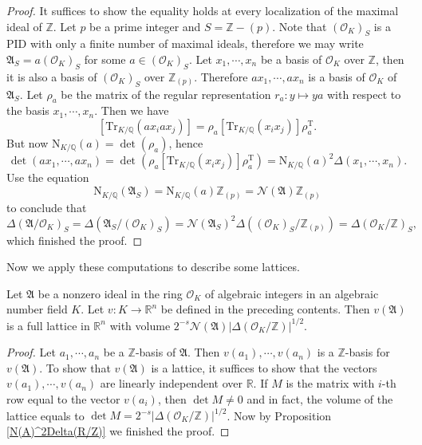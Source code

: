 \begin{proof}
It suffices to show the equality holds at every localization of the maximal ideal of $\mathbb{Z}$. Let $p$ be a prime integer and $S=\mathbb{Z}-(p)$. Note that $(\mathcal{O}_K)_S$ is a PID with only a finite number of maximal ideals, therefore we may write $\mathfrak{A}_S=a(\mathcal{O}_K)_S$ for some $a\in(\mathcal{O}_K)_S$. Let $x_1,\cdots,x_n$ be a basis of $\mathcal{O}_K$ over $\mathbb{Z}$, then it is also a basis of $(\mathcal{O}_K)_S$ over $\mathbb{Z}_{(p)}$. Therefore $ax_1,\cdots,ax_n$ is a basis of $\mathcal{O}_K$ of $\mathfrak{A}_S$. Let $\rho_a$ be the matrix of the regular representation $r_a:y\mapsto ya$ with respect to the basis $x_1,\cdots,x_n$. Then we have 
$$
\left[ \mathrm{Tr}_{K/\mathbb{Q}}\left( ax_iax_j \right) \right] =\rho _a\left[ \mathrm{Tr}_{K/\mathbb{Q}}\left( x_ix_j \right) \right] \rho _{a}^{\mathrm{T}}.
$$
But now $\mathrm{N}_{K/\mathbb{Q}}(a)=\det(\rho_a)$, hence 
$$
\det \left( ax_1,\cdots ,ax_n \right) =\det \left( \rho _a\left[ \mathrm{Tr}_{K/\mathbb{Q}}\left( x_ix_j \right) \right] \rho _{a}^{\mathrm{T}} \right) =\mathrm{N}_{K/\mathbb{Q}}\left( a \right) ^2\Delta \left( x_1,\cdots ,x_n \right) .
$$
Use the equation 
$$
\mathrm{N}_{K/\mathbb{Q}}\left( \mathfrak{A} _S \right) =\mathrm{N}_{K/\mathbb{Q}}\left( a \right) \mathbb{Z} _{\left( p \right)}=\mathcal{N} \left( \mathfrak{A} \right) \mathbb{Z} _{\left( p \right)}
$$
to conclude that 
$$
\Delta \left( \mathfrak{A} /\mathcal{O} _K \right) _S=\Delta \left( \mathfrak{A} _S/\left( \mathcal{O} _K \right) _S \right) =\mathcal{N} \left( \mathfrak{A} _S \right) ^2\Delta \left( \left( \mathcal{O} _K \right) _S/\mathbb{Z} _{\left( p \right)} \right) =\Delta \left( \mathcal{O} _K/\mathbb{Z} \right) _S,
$$
which finished the proof.
\end{proof}
Now we apply these computations to describe some lattices.
\begin{theorem}
Let $\mathfrak{A}$ be a nonzero ideal in the ring $\mathcal{O}_K$ of algebraic integers in an algebraic number field $K$. Let $v:K\to\mathbb{R}^n$ be defined in the preceding contents. Then $v(\mathfrak{A})$ is a full lattice in $\mathbb{R}^n$ with volume $2^{-s}\mathcal{N}(\mathfrak{A})|\Delta(\mathcal{O}_K/\mathbb{Z})|^{1/2}$.
\end{theorem}
\begin{proof}
Let $a_1,\cdots,a_n$ be a $\mathbb{Z}$-basis of $\mathfrak{A}$. Then $v(a_1),\cdots,v(a_n)$ is a $\mathbb{Z}$-basis for $v(\mathfrak{A})$. To show that $v(\mathfrak{A})$ is a lattice, it suffices to show that the vectors $v(a_1),\cdots,v(a_n)$ are linearly independent over $\mathbb{R}$. If $M$ is the matrix with $i$-th row equal to the vector $v(a_i)$, then $\det M\ne 0$ and in fact, the volume of the lattice equals to $\det M=2^{-s}|\Delta(\mathcal{O}_K/\mathbb{Z})|^{1/2}$. Now by Proposition \ref{N(A)^2Delta(R/Z)} we finished the proof.
\end{proof}
